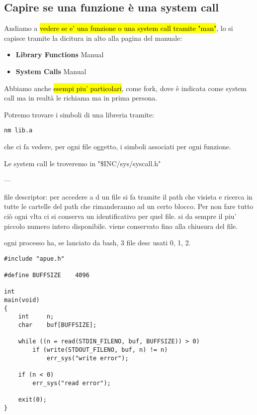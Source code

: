 \subsection{Capire se una funzione è una system call}

Andiamo a \hl{vedere se e' una funzione o una system call tramite "man"}, lo si capisce tramite la dicitura in alto alla pagina del manuale:

	\begin{itemize}
		\item \textbf{Library Functions} Manual
		\item \textbf{System Calls} Manual
	\end{itemize}

Abbiamo anche \hl{esempi piu' particolari}, come fork, dove è indicata come system call ma in realtà le richiama ma in prima persona.


Potremo trovare i simboli di una libreria tramite:

\begin{lstlisting}
nm lib.a
\end{lstlisting}

che ci fa vedere, per ogni file oggetto, i simboli associati per ogni funzione.

Le system call le troveremo in "\$INC/sys/syscall.h"







---

file descriptor: per accedere a d un file si fa tramite il path che visista e ricerca in tutte le cartelle del path che rimanderanno ad un certo blocco. Per non fare tutto ciò ogni vlta ci si conserva un identificativo per quel file. si da sempre il piu' piccolo numero intero disponibile. viene conservato fino alla chiusura del file.

ogni processo ha, se lanciato da bash, 3 file desc usati 0, 1, 2.

\begin{lstlisting}
#include "apue.h"

#define	BUFFSIZE	4096

int
main(void)
{
	int		n;
	char	buf[BUFFSIZE];

	while ((n = read(STDIN_FILENO, buf, BUFFSIZE)) > 0)
		if (write(STDOUT_FILENO, buf, n) != n)
			err_sys("write error");

	if (n < 0)
		err_sys("read error");

	exit(0);
}
\end{lstlisting}

